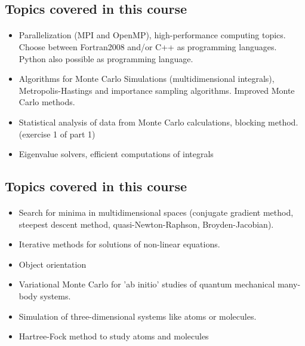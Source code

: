 \documentclass[%
twoside,                 %
final,                   %
10pt]{article}
\begin{document}
\noindent




\subsection*{Topics covered in this course}

\paragraph{}
\begin{itemize}
  \item Parallelization (MPI and OpenMP), high-performance computing topics. Choose between Fortran2008 and/or C++ as programming languages. Python also possible as programming language. 

  \item Algorithms for Monte Carlo Simulations (multidimensional integrals), Metropolis-Hastings and importance sampling algorithms.  Improved Monte Carlo methods.

  \item Statistical analysis of data  from Monte Carlo calculations, blocking method. (exercise 1 of part 1)

  \item Eigenvalue solvers, efficient computations of integrals
\end{itemize}

\noindent



\subsection*{Topics covered in this course}

\paragraph{}
\begin{itemize}
  \item Search for minima in multidimensional spaces (conjugate gradient method, steepest descent method, quasi-Newton-Raphson, Broyden-Jacobian).

  \item Iterative methods for solutions of non-linear equations.

  \item Object orientation

  \item Variational Monte Carlo for 'ab initio' studies of quantum mechanical many-body systems.

  \item Simulation of three-dimensional systems like atoms or molecules.

  \item Hartree-Fock method to study atoms and molecules
\end{itemize}
\end{document}
